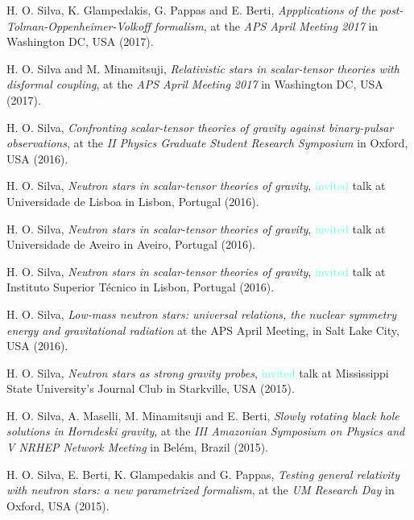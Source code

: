 \documentclass[10pt]{article}
\begin{document}
\begin{bibenum}
    \item H. O. Silva, K. Glampedakis, G. Pappas and E. Berti,
    \emph{Appplications of the post-Tolman-Oppenheimer-Volkoff formalism},
    at the \emph{APS April Meeting 2017}
    in Washington DC, USA (2017).

    \item H. O. Silva and M. Minamitsuji,
    \emph{Relativistic stars in scalar-tensor theories with disformal coupling},
    at the \emph{APS April Meeting 2017}
    in Washington DC, USA (2017).

    \item H. O. Silva,
    \emph{Confronting scalar-tensor theories of gravity
    against binary-pulsar observations},
    at the \emph{II Physics Graduate Student Research Symposium}
    in Oxford, USA (2016).

    \item H. O. Silva,
    \emph{Neutron stars in scalar-tensor theories of gravity},
    \textcolor{Aquamarine}{invited} talk at Universidade de Lisboa
    in Lisbon, Portugal (2016).

    \item H. O. Silva,
    \emph{Neutron stars in scalar-tensor theories of gravity},
    \textcolor{Aquamarine}{invited} talk at Universidade de Aveiro
    in Aveiro, Portugal (2016).

    \item H. O. Silva,
    \emph{Neutron stars in scalar-tensor theories of gravity},
    \textcolor{Aquamarine}{invited} talk at Instituto Superior T\'ecnico
    in Lisbon, Portugal (2016).

    \item H. O. Silva,
    \emph{Low-mass neutron stars: universal relations, the nuclear symmetry energy and gravitational radiation}
    at the {APS April Meeting},
    in Salt Lake City, USA (2016).

    \item H. O. Silva,
    \emph{Neutron stars as strong gravity probes},
    \textcolor{Aquamarine}{invited} talk at Mississippi State University's Journal Club
    in Starkville, USA (2015).

    \item H. O. Silva, A. Maselli, M. Minamitsuji and E. Berti,
    \emph{Slowly rotating black hole solutions in Horndeski gravity},
    at the \emph{III Amazonian Symposium on Physics and V NRHEP Network Meeting}
    in Bel\'em, Brazil (2015).

    \item H. O. Silva, E. Berti, K. Glampedakis and G. Pappas,
    \emph{Testing general relativity with neutron stars: a new
    parametrized formalism},
    at the \emph{UM Research Day}
    in Oxford, USA (2015).


\end{bibenum}
\end{document}
